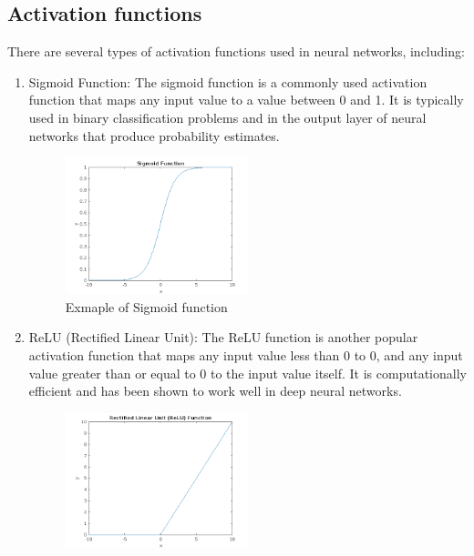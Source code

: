 \subsection{Activation functions} \label{subsec:nnaf}
There are several types of activation functions used in neural networks, including:
\begin{enumerate}
    \item Sigmoid Function: The sigmoid function is a commonly used activation function that maps any input value
    to a value between 0 and 1. It is typically used in binary classification problems and in the output layer of
    neural networks that produce probability estimates.
    \begin{center}
        \begin{figure}[!ht]
            \centering
            \includegraphics[width=0.5\textwidth]{figures/sigmoid}
            \caption{Exmaple of Sigmoid function}
            \label{fig:sigmoid}
        \end{figure}
    \end{center}
    \item ReLU (Rectified Linear Unit): The ReLU function is another popular activation function that maps any
    input value less than 0 to 0, and any input value greater than or equal to 0 to the input value itself.
    It is computationally efficient and has been shown to work well in deep neural networks.
    \begin{center}
        \begin{figure}[!ht]
            \centering
            \includegraphics[width=0.5\textwidth]{figures/relu}

\end{figure}
\end{center}
\end{enumerate}

